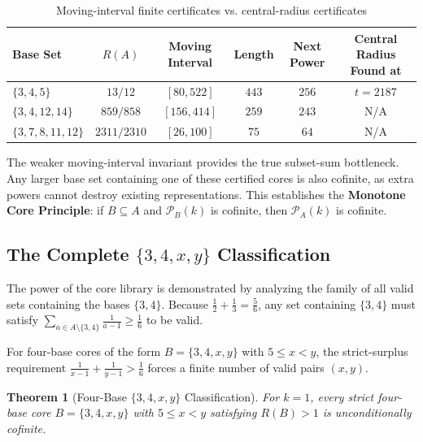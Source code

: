 \documentclass[12pt,reqno]{amsart}
\newtheorem{theorem}{Theorem}[section]
\theoremstyle{definition}
\begin{document}
\begin{table}[h]
\centering
\begin{tabular}{|l|c|c|c|c|c|}
\hline
\textbf{Base Set} & \textbf{$R(A)$} & \textbf{Moving Interval} & \textbf{Length} & \textbf{Next Power} & \textbf{Central Radius Found at} \\
\hline
$\{3,4,5\}$ & $13/12$ & $[80,522]$ & $443$ & $256$ & $t = 2187$ \\
$\{3,4,12,14\}$ & $859/858$ & $[156,414]$ & $259$ & $243$ & N/A \\
$\{3,7,8,11,12\}$ & $2311/2310$ & $[26,100]$ & $75$ & $64$ & N/A \\
\hline
\end{tabular}
\caption{Moving-interval finite certificates vs. central-radius certificates}
\end{table}

The weaker moving-interval invariant provides the true subset-sum bottleneck. Any larger base set containing one of these certified cores is also cofinite, as extra powers cannot destroy existing representations. This establishes the \textbf{Monotone Core Principle}: if $B \subseteq A$ and $\mathcal{P}_B(k)$ is cofinite, then $\mathcal{P}_A(k)$ is cofinite. 

\subsection{The Complete $\{3,4,x,y\}$ Classification}
The power of the core library is demonstrated by analyzing the family of all valid sets containing the bases $\{3,4\}$. Because $\frac{1}{2} + \frac{1}{3} = \frac{5}{6}$, any set containing $\{3,4\}$ must satisfy $\sum_{a \in A \setminus \{3,4\}} \frac{1}{a-1} \ge \frac{1}{6}$ to be valid.

For four-base cores of the form $B = \{3,4,x,y\}$ with $5 \le x < y$, the strict-surplus requirement $\frac{1}{x-1} + \frac{1}{y-1} > \frac{1}{6}$ forces a finite number of valid pairs $(x,y)$.

\begin{theorem}[Four-Base $\{3,4,x,y\}$ Classification]\label{thm:classification}
For $k=1$, every strict four-base core $B = \{3, 4, x, y\}$ with $5 \le x < y$ satisfying $R(B) > 1$ is unconditionally cofinite.
\end{theorem}
\end{document}
